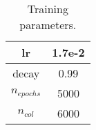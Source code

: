 \begin{table}[htbp]
\centering
\begin{tabular}{|c|c|}
\hline
lr & 1.7e-2 \\
\hline
decay & 0.99 \\
\hline
$n_{epochs}$ & 5000 \\
\hline
$n_{col}$ & 6000 \\
\hline
\end{tabular}
\caption{Training parameters.}
\label{tab:paramtest1}
\end{table}